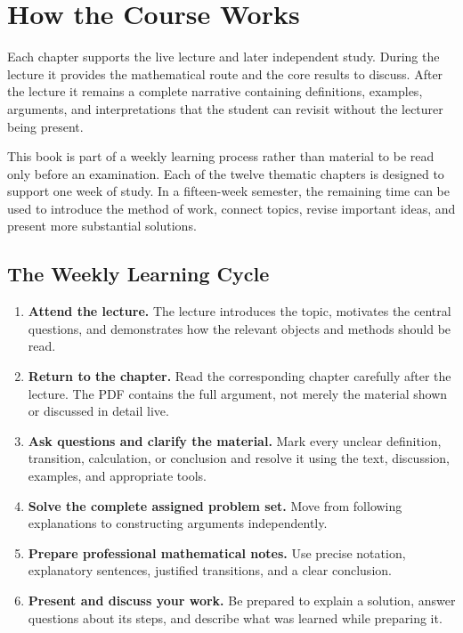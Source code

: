 \section*{How the Course Works}

Each chapter supports the live lecture and later independent study. During the
lecture it provides the mathematical route and the core results to discuss.
After the lecture it remains a complete narrative containing definitions,
examples, arguments, and interpretations that the student can revisit without
the lecturer being present.

This book is part of a weekly learning process rather than material to be read
only before an examination. Each of the twelve thematic chapters is designed to
support one week of study. In a fifteen-week semester, the remaining time can be
used to introduce the method of work, connect topics, revise important ideas,
and present more substantial solutions.

\subsection*{The Weekly Learning Cycle}

\begin{enumerate}
    \item \textbf{Attend the lecture.}
    The lecture introduces the topic, motivates the central questions, and
    demonstrates how the relevant objects and methods should be read.

    \item \textbf{Return to the chapter.}
    Read the corresponding chapter carefully after the lecture. The PDF contains
    the full argument, not merely the material shown or discussed in detail live.

    \item \textbf{Ask questions and clarify the material.}
    Mark every unclear definition, transition, calculation, or conclusion and
    resolve it using the text, discussion, examples, and appropriate tools.

    \item \textbf{Solve the complete assigned problem set.}
    Move from following explanations to constructing arguments independently.

    \item \textbf{Prepare professional mathematical notes.}
    Use precise notation, explanatory sentences, justified transitions, and a
    clear conclusion.

    \item \textbf{Present and discuss your work.}
    Be prepared to explain a solution, answer questions about its steps, and
    describe what was learned while preparing it.
\end{enumerate}

